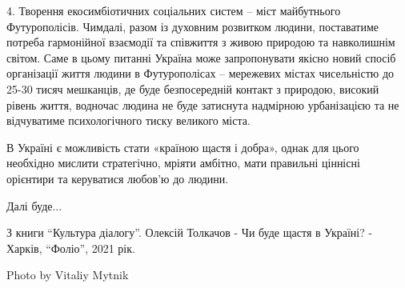 4. Творення екосимбіотичних соціальних систем – міст майбутнього Футурополісів.
Чимдалі, разом із духовним розвитком людини, поставатиме потреба гармонійної
взаємодії та співжиття з живою природою та навколишнім світом. Саме в цьому
питанні Україна може запропонувати якісно новий спосіб організації життя людини
в Футурополісах – мережевих містах чисельністю до 25-30 тисяч мешканців, де
буде безпосередній контакт з природою, високий рівень життя, водночас людина не
буде затиснута надмірною урбанізацією та не відчуватиме психологічного тиску
великого міста. 

В Україні є можливість стати «країною щастя і добра», однак для цього необхідно
мислити стратегічно, мріяти амбітно, мати правильні ціннісні орієнтири та
керуватися любов’ю до людини. 

Далі буде...

З книги \enquote{Культура діалогу}. Олексій Толкачов - Чи буде щастя в Україні? -
Харків, \enquote{Фоліо}, 2021 рік.

Photo by Vitaliy Mytnik
